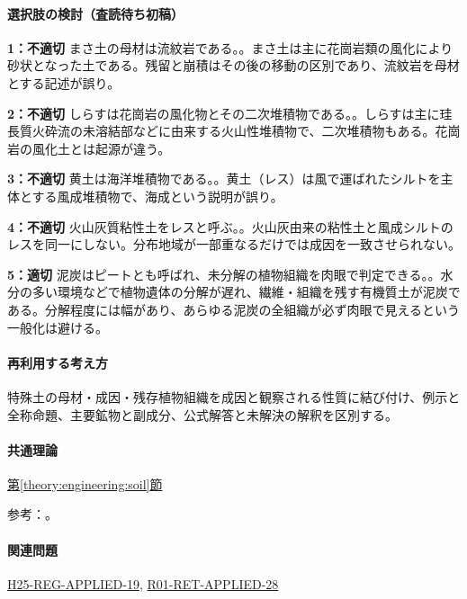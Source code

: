 \paragraph{選択肢の検討（査読待ち初稿）}\mbox{}\par

\noindent\textbf{1：不適切} まさ土の母材は流紋岩である。。まさ土は主に花崗岩類の風化により砂状となった土である。残留と崩積はその後の移動の区別であり、流紋岩を母材とする記述が誤り。\par

\noindent\textbf{2：不適切} しらすは花崗岩の風化物とその二次堆積物である。。しらすは主に珪長質火砕流の未溶結部などに由来する火山性堆積物で、二次堆積物もある。花崗岩の風化土とは起源が違う。\par

\noindent\textbf{3：不適切} 黄土は海洋堆積物である。。黄土（レス）は風で運ばれたシルトを主体とする風成堆積物で、海成という説明が誤り。\par

\noindent\textbf{4：不適切} 火山灰質粘性土をレスと呼ぶ。。火山灰由来の粘性土と風成シルトのレスを同一にしない。分布地域が一部重なるだけでは成因を一致させられない。\par

\noindent\textbf{5：適切} 泥炭はピートとも呼ばれ、未分解の植物組織を肉眼で判定できる。。水分の多い環境などで植物遺体の分解が遅れ、繊維・組織を残す有機質土が泥炭である。分解程度には幅があり、あらゆる泥炭の全組織が必ず肉眼で見えるという一般化は避ける。\par

\paragraph{再利用する考え方} 特殊土の母材・成因・残存植物組織を成因と観察される性質に結び付け、例示と全称命題、主要鉱物と副成分、公式解答と未解決の解釈を区別する。

\paragraph{共通理論} \hyperref[theory:engineering:soil]{第\ref*{theory:engineering:soil}節}

\par 参考：\cite{mlit_masa,maff_shiras2017,mlit_peat,gsj_loess2002}。

\paragraph{関連問題} \hyperref[q:h25-reg-applied-19]{H25-REG-APPLIED-19}, \hyperref[q:r01-ret-applied-28]{R01-RET-APPLIED-28}

